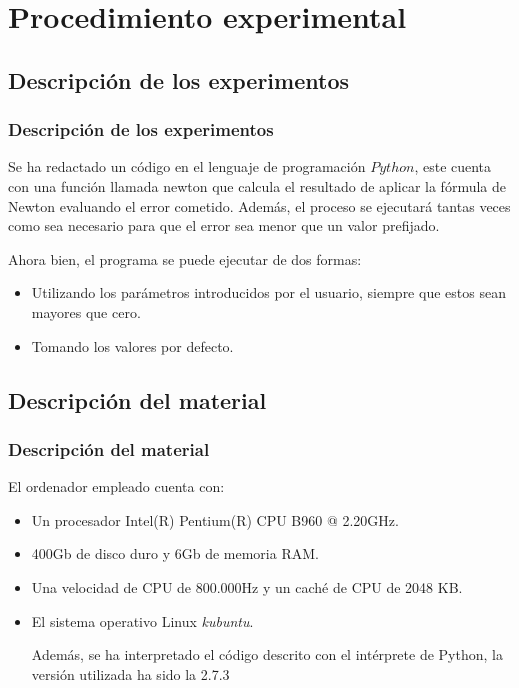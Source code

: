 \documentclass{beamer}
\begin{document}
\section{Procedimiento experimental}

\subsection{Descripción de los experimentos}
\begin{frame}
\frametitle{Descripción de los experimentos}

Se ha redactado un código en el lenguaje de programación $Python$, este cuenta con una función llamada newton que calcula el resultado de aplicar la fórmula de Newton evaluando el error cometido.
Además, el proceso se ejecutará tantas veces como sea necesario para que el error sea menor que un valor prefijado.
\end{frame}
\begin{frame}
Ahora bien, el programa se puede ejecutar de dos formas:
\begin{itemize}
\item
Utilizando los parámetros introducidos por el usuario, siempre que estos sean mayores que cero.\pause
\item
Tomando los valores por defecto.
\end{itemize}
\end{frame}

\subsection{Descripción del material}

\begin{frame}
\frametitle{Descripción del material}
El ordenador empleado cuenta con: 
\begin{itemize}
\item
Un procesador Intel(R) Pentium(R) CPU B960 @ 2.20GHz.\pause
\item
400Gb de disco duro y 6Gb de memoria RAM.\pause
\item
Una velocidad de CPU de 800.000Hz y un caché de CPU de 2048 KB.\pause
\item
El sistema operativo Linux \textit{kubuntu}.\pause

Además, se ha interpretado el código descrito con el intérprete de Python, la versión utilizada ha sido la 2.7.3


\end{itemize}
\end{frame}
\end{document}
